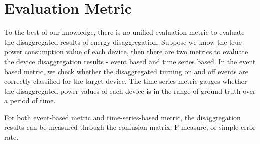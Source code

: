 \section{Evaluation Metric}
\label{sec:evaluation}
To the best of our knowledge, there is no unified evaluation metric to evaluate the
disaggregated results of energy disaggregation.
Suppose we know the true power consumption value of each device, then there are two 
metrics to evaluate the  device disaggregation results - event based and time 
series based. In the event based metric, we check whether the 
disaggregated turning on and off events are correctly classified for the target device. 
The time series metric gauges whether the disaggregated power values of each device 
is in the range of ground truth over a period of time. 

For both event-based metric and time-series-based metric, 
the disaggregation results can be measured through the confusion matrix, 
F-measure, or simple error rate. 
 



